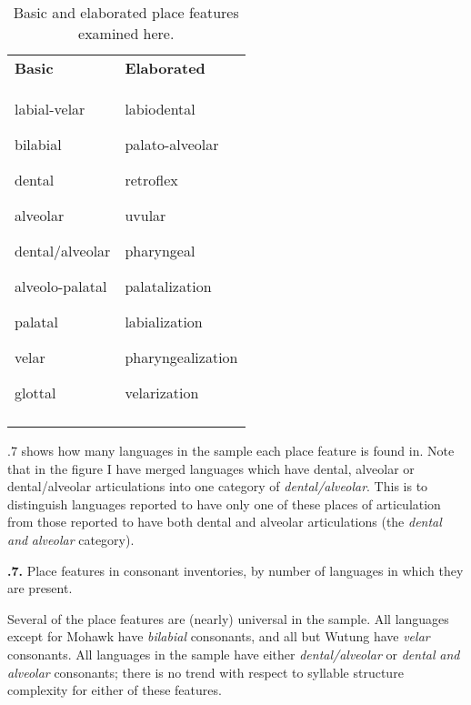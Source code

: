 \begin{table}
\begin{tabularx}{\textwidth}{XX}
\lsptoprule

\textbf{Basic} & \textbf{Elaborated}\\
labial-velar

bilabial

dental

alveolar

dental/alveolar

alveolo-palatal

palatal

velar

glottal & labiodental

palato-alveolar

retroflex

uvular

pharyngeal

palatalization

labialization

pharyngealization

velarization\\
\lspbottomrule
\end{tabularx}
\caption{\label{4.13}Basic and elaborated place features examined here.}
\end{table}




  .7 shows how many languages in the sample each place feature is found in. Note that in the figure I have merged languages which have dental, alveolar or dental/alveolar articulations into one category of \textit{dental/alveolar}. This is to distinguish languages reported to have only one of these places of articulation from those reported to have both dental and alveolar articulations (the \textit{dental} \textit{and} \textit{alveolar} category).





\textbf{.7.} Place features in consonant inventories, by number of languages in which they are present.



  Several of the place features are (nearly) universal in the sample. All languages except for Mohawk have \textit{bilabial} consonants, and all but Wutung have \textit{velar} consonants. All languages in the sample have either \textit{dental/alveolar} or \textit{dental} \textit{and} \textit{alveolar} consonants; there is no trend with respect to syllable structure complexity for either of these features.



